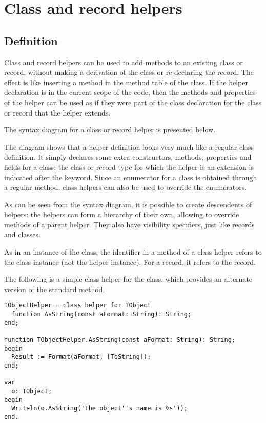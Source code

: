 \chapter{Class and record helpers}
\label{ch:ClassHelpers}
%

\section{Definition}
Class and record helpers can be used to add methods to an existing class or
record, without making a derivation of the class or re-declaring the record.
The effect is like inserting a method in the method table of the class.
If the helper declaration is in the current scope of the code, then the
methods and properties of the helper can be used as if they were part of the 
class declaration for the class or record that the helper extends.

The syntax diagram for a class or record helper is presented below.

The diagram shows that a helper definition looks very much like a regular
class definition. It simply declares some extra constructors, methods, properties and fields
for a class: the class or record type for which the helper is an extension is indicated
after the  keyword. Since an enumerator for a class is obtained
through a regular method, class helpers can also be used to override the
enumerators.

As can be seen from the syntax diagram, it is possible to create descendents of helpers: 
the helpers can form a hierarchy of their own, allowing to override methods of a
parent helper. They also have visibility specifiers, just like records and
classes.

As in an instance of the class, the  identifier in a method of a
class helper refers to the class instance (not the helper instance). For a
record, it refers to the record.

The following is a simple class helper for the  class, which provides
an alternate version of the standard  method.
\begin{verbatim}
TObjectHelper = class helper for TObject
  function AsString(const aFormat: String): String; 
end;
 
function TObjectHelper.AsString(const aFormat: String): String;
begin
  Result := Format(aFormat, [ToString]);
end;
 
var
  o: TObject;
begin
  Writeln(o.AsString('The object''s name is %s'));
end.
\end{verbatim}

